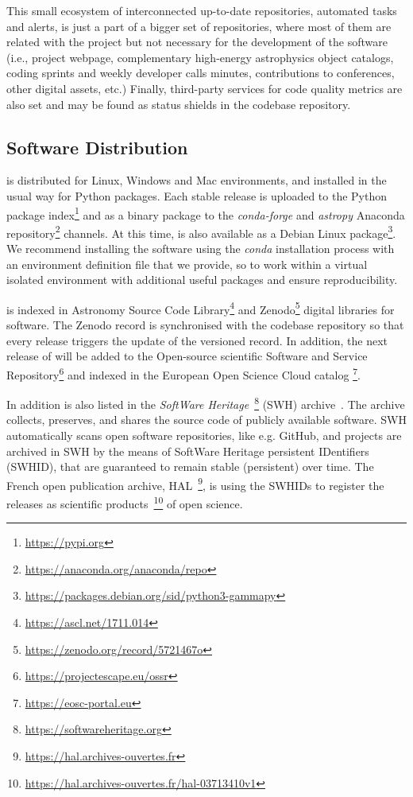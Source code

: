 \documentclass[traditabstract, longauth]{aa}
\begin{document}
This small ecosystem of interconnected up-to-date repositories, automated tasks
and alerts, is just a part of a bigger set of \github repositories, where most
of them are related with the project but not necessary for the development of
the software (i.e., project webpage, complementary high-energy astrophysics
object catalogs, coding sprints and weekly developer calls minutes,
contributions to conferences, other digital assets, etc.) Finally, third-party
services for code quality metrics are also set and may be found as status
shields in the codebase repository.

\subsection{Software Distribution}
\label{ssec:software-distribution}

\gammapy is distributed for Linux, Windows and Mac environments, and installed
in the usual way for Python packages. Each stable release is uploaded to the
Python package index\footnote{\url{https://pypi.org}} and as a binary package
to the \textit{conda-forge} and \textit{astropy} Anaconda
repository\footnote{\url{https://anaconda.org/anaconda/repo}} channels. At this
time, \gammapy is also available as a Debian Linux
package\footnote{\url{https://packages.debian.org/sid/python3-gammapy}}. We
recommend installing the software using the \textit{conda} installation process
with an environment definition file that we provide, so to work within a
virtual isolated environment with additional useful packages and ensure
reproducibility.

\gammapy is indexed in Astronomy Source Code
Library\footnote{\url{https://ascl.net/1711.014}} and
Zenodo\footnote{\url{https://zenodo.org/record/5721467o}} digital libraries for
software. The Zenodo record is synchronised with the codebase \github repository
so that every release triggers the update of the versioned record. In addition,
the next release of \gammapy will be added to the Open-source scientific
Software and Service Repository\footnote{\url{https://projectescape.eu/ossr}}
and indexed in the European Open Science Cloud
catalog \footnote{\url{https://eosc-portal.eu}}.

In addition \gammapy is also listed in the \textit{SoftWare
Heritage}~\footnote{\url{https://softwareheritage.org}} (SWH) archive~\cite{DiCosmo2020}.
The archive collects, preserves, and shares the source code of publicly available software.
SWH automatically scans open software repositories, like e.g. GitHub, and projects are archived in SWH by the
means of SoftWare Heritage persistent IDentifiers (SWHID), that are guaranteed to remain stable (persistent)
over time. The French open publication archive, HAL~\footnote{\url{https://hal.archives-ouvertes.fr}},
is using the \gammapy SWHIDs to register the releases as scientific
products~\footnote{\url{https://hal.archives-ouvertes.fr/hal-03713410v1}} of open science.
\end{document}
